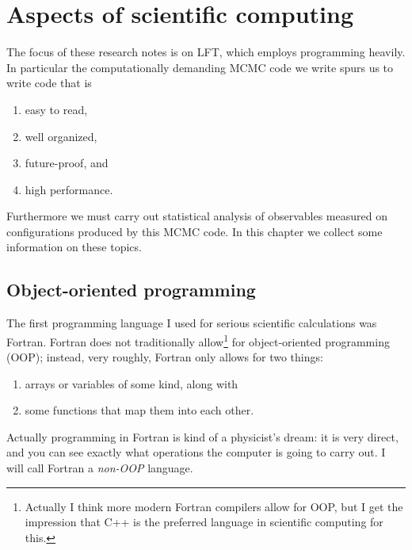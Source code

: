 \chapter{Aspects of scientific computing}\label{ch:computer}

The focus of these research notes is on LFT, which employs programming heavily.
In particular the computationally demanding MCMC code we write spurs us to
write code that is
\begin{enumerate}
  \item easy to read,
  \item well organized,
  \item future-proof, and
  \item high performance.
\end{enumerate}
Furthermore we must carry out statistical analysis of observables measured on
configurations produced by this MCMC code. In this chapter we collect
some information on these topics.


\section{Object-oriented programming}\label{sec:oop}


The first programming language I used for serious scientific calculations
was Fortran. Fortran does not traditionally 
allow\footnote{Actually I think more modern Fortran compilers 
allow for OOP, but I get the impression that C++ is the preferred language
in scientific computing for this.} for object-oriented programming (OOP); 
instead, very roughly, Fortran only
allows for two things:
\begin{enumerate}
  \item arrays or variables of some kind, along with 
  \item some functions that map them into each other.
\end{enumerate}
Actually programming in Fortran is kind
of a physicist's dream: it is very direct, and you can see exactly what
operations the computer is going to carry out. I will call Fortran
a {\it non-OOP} language.

